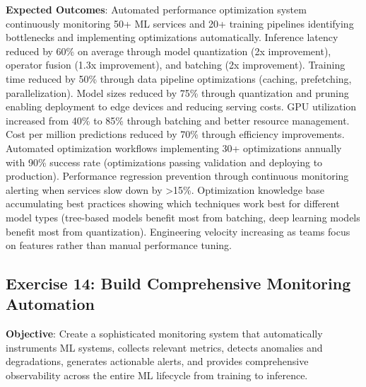 \textbf{Expected Outcomes}: Automated performance optimization system continuously monitoring 50+ ML services and 20+ training pipelines identifying bottlenecks and implementing optimizations automatically. Inference latency reduced by 60\% on average through model quantization (2x improvement), operator fusion (1.3x improvement), and batching (2x improvement). Training time reduced by 50\% through data pipeline optimizations (caching, prefetching, parallelization). Model sizes reduced by 75\% through quantization and pruning enabling deployment to edge devices and reducing serving costs. GPU utilization increased from 40\% to 85\% through batching and better resource management. Cost per million predictions reduced by 70\% through efficiency improvements. Automated optimization workflows implementing 30+ optimizations annually with 90\% success rate (optimizations passing validation and deploying to production). Performance regression prevention through continuous monitoring alerting when services slow down by >15\%. Optimization knowledge base accumulating best practices showing which techniques work best for different model types (tree-based models benefit most from batching, deep learning models benefit most from quantization). Engineering velocity increasing as teams focus on features rather than manual performance tuning.

\subsection{Exercise 14: Build Comprehensive Monitoring Automation}

\textbf{Objective}: Create a sophisticated monitoring system that automatically instruments ML systems, collects relevant metrics, detects anomalies and degradations, generates actionable alerts, and provides comprehensive observability across the entire ML lifecycle from training to inference.

